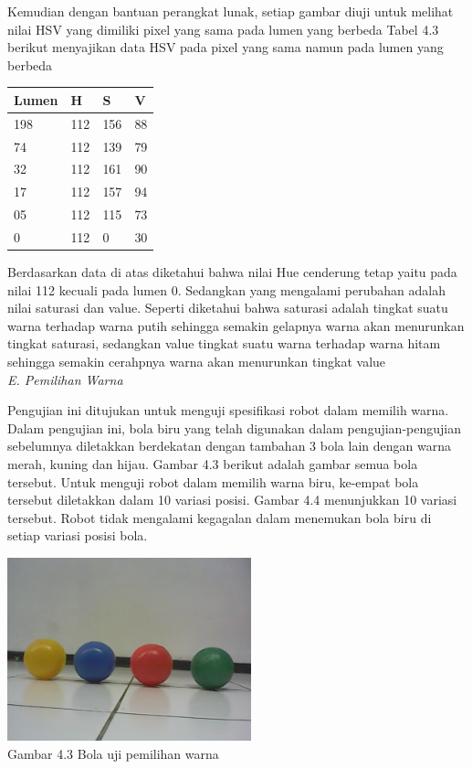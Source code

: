\documentclass[10pt,journal,compsoc]{IEEEtran}
\begin{document}
    Kemudian dengan bantuan perangkat lunak, setiap gambar diuji untuk melihat nilai HSV yang dimiliki pixel yang sama pada lumen yang berbeda
  Tabel 4.3 berikut menyajikan data HSV pada pixel yang sama namun pada lumen yang berbeda
  
   \begin{center}
   \begin{tabular}{ |l|l|l|l| }
    \hline
    Lumen & H & S & V\\
   \hline
    198 & 112  & 156  & 88 \\
    74  & 112  & 139  & 79 \\
    32  & 112  & 161  & 90 \\
    17  & 112  & 157  & 94 \\
    05  & 112  & 115  & 73 \\
    0   & 112  & 0    & 30 \\
    \hline
   \end{tabular}
   \end{center}
   
   Berdasarkan data di atas diketahui bahwa nilai Hue cenderung tetap yaitu pada nilai 112 kecuali pada lumen 0.
   Sedangkan yang mengalami perubahan adalah nilai saturasi dan value. 
   Seperti diketahui bahwa saturasi adalah tingkat suatu warna terhadap warna putih sehingga semakin gelapnya warna akan menurunkan tingkat saturasi, sedangkan value tingkat suatu warna terhadap warna hitam sehingga semakin cerahpnya warna akan menurunkan tingkat value\\

  \noindent \textit{E. Pemilihan Warna}
  
  Pengujian ini ditujukan untuk menguji spesifikasi robot dalam memilih warna. 
  Dalam pengujian ini, bola biru yang telah digunakan dalam pengujian-pengujian sebelumnya diletakkan berdekatan dengan tambahan 3 bola lain dengan warna merah, kuning dan hijau. 
  Gambar 4.3 berikut adalah gambar semua bola tersebut. 
  Untuk menguji robot dalam memilih warna biru, ke-empat bola tersebut diletakkan dalam 10 variasi posisi. 
  Gambar 4.4 menunjukkan 10 variasi tersebut. Robot tidak mengalami kegagalan dalam menemukan bola biru di setiap variasi posisi bola.

  \begin{center}
    \includegraphics[width=200pt]{ball_all}\\
    Gambar 4.3 Bola uji pemilihan warna
  \end{center}
  
\end{document}
